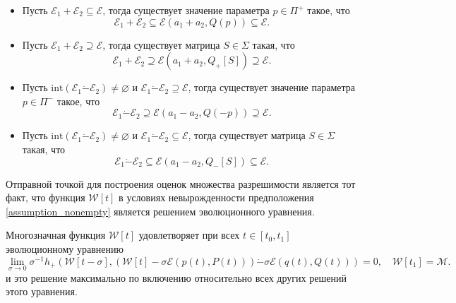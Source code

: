 \begin{theorem}
    \begin{itemize}
        \item Пусть \( \mathcal{E}_1 + \mathcal{E}_2 \subseteq \mathcal{E} \), тогда существует значение
         параметра \( p \in \Pi^+ \) такое, что
        \begin{equation}
            \mathcal{E}_1 + \mathcal{E}_2 \subseteq \mathcal{E}(a_1 + a_2, Q(p)) \subseteq \mathcal{E}.
        \end{equation}
        \item Пусть \( \mathcal{E}_1 + \mathcal{E}_2 \supseteq \mathcal{E} \), тогда существует матрица
         \( S \in \Sigma \) такая, что
        \begin{equation}
            \mathcal{E}_1 + \mathcal{E}_2 \supseteq \mathcal{E}(a_1 + a_2, Q_+[S]) \supseteq \mathcal{E}.
        \end{equation}
        \item Пусть \(\mathrm{int}(\mathcal{E}_1 \dot{-} \mathcal{E}_2) \ne \varnothing \) и \( \mathcal{E}_1
         \dot{-} \mathcal{E}_2 \supseteq \mathcal{E} \), тогда существует значение параметра \( p \in 
         \Pi^- \) такое, что
        \begin{equation}
            \mathcal{E}_1 \dot{-} \mathcal{E}_2 \supseteq \mathcal{E}(a_1 - a_2, Q(-p)) \supseteq \mathcal{E}.
        \end{equation}
        \item Пусть \(\mathrm{int}(\mathcal{E}_1 \dot{-} \mathcal{E}_2) \ne \varnothing \) и \( \mathcal{E}_1
         \dot{-} \mathcal{E}_2 \subseteq \mathcal{E} \), тогда существует матрица \( S \in  \Sigma \) 
         такая, что
        \begin{equation}
            \mathcal{E}_1 \dot{-} \mathcal{E}_2 \subseteq \mathcal{E}(a_1 - a_2, Q_-[S]) \subseteq \mathcal{E}.
        \end{equation}
    \end{itemize}
\end{theorem}

Отправной точкой для построения оценок множества разрешимости является тот факт, что функция 
 \( \mathcal{W}[t] \) в условиях невырожденности предположения \eqref{assumption_nonempty} является 
 решением эволюционного уравнения.

\begin{theorem}
    Многозначная функция \( \mathcal{W}[t] \) удовлетворяет при всех \( t \in [t_0, t_1 ]\) 
     эволюционному уравнению
    \begin{equation}\label{evolution_equation}
        \lim_{\sigma \to 0} \sigma^{-1} h_+ \left( \mathcal{W}[t - \sigma], \left( \mathcal{W}[t] - 
         \sigma \mathcal{E}(p(t), P(t)) \right) \dot{-} \sigma \mathcal{E}(q(t), Q(t)) \right) = 0,
         \quad \mathcal{W}[t_1] = \mathcal{M}.
    \end{equation}
    и это решение максимально по включению относительно всех других решений этого уравнения. 
\end{theorem}

